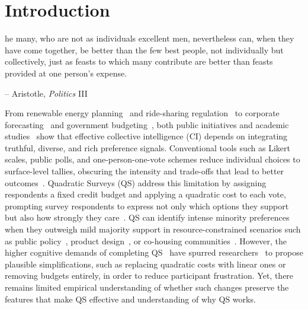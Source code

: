 \section{Introduction}

\begin{displayquote}
[T]he many, who are not as individuals excellent men, nevertheless can, when they have come together, be better than the few best people, not individually but collectively, just as feasts to which many contribute are better than feasts provided at one person's expense.

\begin{flushright}
-- Aristotle, \textit{Politics} III
\end{flushright}
\end{displayquote}

From renewable energy planning~\cite{fishkinConsultingPublicDeliberative2003} and ride-sharing regulation~\cite{hsiao2018vtaiwan} to corporate forecasting~\cite{cowgill2015corporate} and government budgeting~\cite{desousasantosParticipatoryBudgetingPorto1998}, both public initiatives and academic studies~\cite{weylShuWeiPluralityFuture2024, krosnick1999survey} show that effective collective intelligence (CI) depends on integrating truthful, diverse, and rich preference signals. Conventional tools such as Likert scales, public polls, and one-person-one-vote schemes reduce individual choices to surface-level tallies, obscuring the intensity and trade-offs that lead to better outcomes~\cite{quarfoot2017quadratic,posner2017quadratic, krosnick1999survey}. Quadratic Surveys (QS) address this limitation by assigning respondents a fixed credit budget and applying a quadratic cost to each vote, prompting survey respondents to express not only which options they support but also how strongly they care~\cite{chengCanShowWhat2021, quarfoot2017quadratic, cavaille2024cares}. QS can identify intense minority preferences when they outweigh mild majority support in resource-constrained scenarios such as public policy~\cite{chengCanShowWhat2021, quarfoot2017quadratic}, product design~\cite{chengCanShowWhat2021}, or co-housing communities~\cite{karpinskiPotentialQuadraticVoting2025}. However, the higher cognitive demands of completing QS~\cite{chengOrganizeThenVote2025} have spurred researchers~\cite{cavaille2024cares, chengCanShowWhat2021} to propose plausible simplifications, such as replacing quadratic costs with linear ones or removing budgets entirely, in order to reduce participant frustration. Yet, there remains limited empirical understanding of whether such changes preserve the features that make QS effective and understanding of why QS works.


